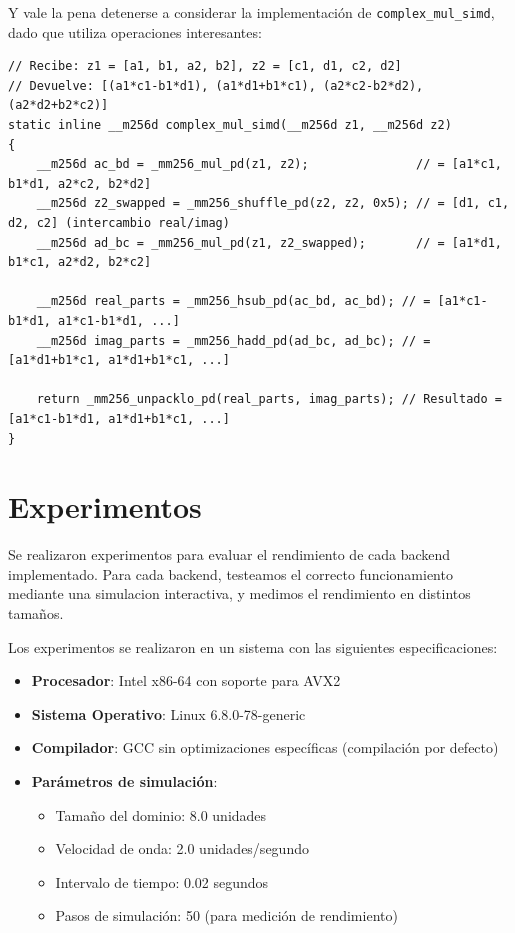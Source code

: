 \documentclass[a4paper]{article}
\begin{document}
Y vale la pena detenerse a considerar la implementación de \texttt{complex\_mul\_simd}, dado que utiliza operaciones interesantes:
\begin{verbatim}
// Recibe: z1 = [a1, b1, a2, b2], z2 = [c1, d1, c2, d2]
// Devuelve: [(a1*c1-b1*d1), (a1*d1+b1*c1), (a2*c2-b2*d2), (a2*d2+b2*c2)]
static inline __m256d complex_mul_simd(__m256d z1, __m256d z2)
{
    __m256d ac_bd = _mm256_mul_pd(z1, z2);               // = [a1*c1, b1*d1, a2*c2, b2*d2]
    __m256d z2_swapped = _mm256_shuffle_pd(z2, z2, 0x5); // = [d1, c1, d2, c2] (intercambio real/imag)
    __m256d ad_bc = _mm256_mul_pd(z1, z2_swapped);       // = [a1*d1, b1*c1, a2*d2, b2*c2]

    __m256d real_parts = _mm256_hsub_pd(ac_bd, ac_bd); // = [a1*c1-b1*d1, a1*c1-b1*d1, ...]
    __m256d imag_parts = _mm256_hadd_pd(ad_bc, ad_bc); // = [a1*d1+b1*c1, a1*d1+b1*c1, ...]

    return _mm256_unpacklo_pd(real_parts, imag_parts); // Resultado = [a1*c1-b1*d1, a1*d1+b1*c1, ...]
}
\end{verbatim}



\section{Experimentos}

Se realizaron experimentos para evaluar el rendimiento de cada backend implementado. Para cada backend, testeamos el correcto funcionamiento mediante una simulacion interactiva, y medimos el rendimiento en distintos tamaños.

Los experimentos se realizaron en un sistema con las siguientes especificaciones:
\begin{itemize}
    \item \textbf{Procesador}: Intel x86-64 con soporte para AVX2
    \item \textbf{Sistema Operativo}: Linux 6.8.0-78-generic
    \item \textbf{Compilador}: GCC sin optimizaciones específicas (compilación por defecto)
    \item \textbf{Parámetros de simulación}:
          \begin{itemize}
              \item Tamaño del dominio: 8.0 unidades
              \item Velocidad de onda: 2.0 unidades/segundo
              \item Intervalo de tiempo: 0.02 segundos
              \item Pasos de simulación: 50 (para medición de rendimiento)
          \end{itemize}
\end{itemize}
\end{document}
